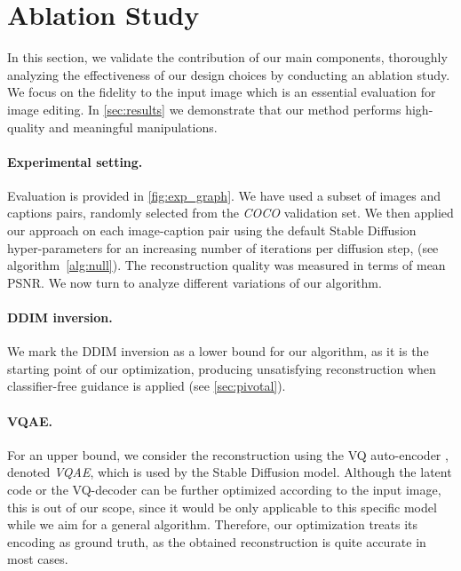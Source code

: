 









\section{Ablation Study}
\label{sec:ablation}
\vspace{-0.1cm}



In this section, we validate the contribution of our main components, thoroughly analyzing the effectiveness of our design choices by conducting an ablation study. We focus on the fidelity to the input image which is an essential evaluation for image editing. In \cref{sec:results} we demonstrate that our method performs high-quality and meaningful manipulations.




\vspace{-0.4cm}
\paragraph{Experimental setting.} Evaluation is provided in \cref{fig:exp_graph}. We have used a subset of  images and captions pairs, randomly selected from the \textit{COCO} \cite{chen2015microsoft} validation set.
We then applied our approach on each image-caption pair using the default Stable Diffusion hyper-parameters for an increasing number of iterations per diffusion step,  (see algorithm~\ref{alg:null}). The reconstruction quality was measured in terms of mean PSNR. We now turn to analyze different variations of our algorithm. 

\vspace{-0.4cm}
\paragraph{DDIM inversion.} We mark the DDIM inversion as a lower bound for our algorithm, as it is the starting point of our optimization, producing unsatisfying reconstruction when classifier-free guidance is applied (see \cref{sec:pivotal}).

\vspace{-0.4cm}
\paragraph{VQAE.} For an upper bound, we consider the reconstruction using the VQ auto-encoder \cite{esser2020taming}, denoted \textit{VQAE}, which is used by the Stable Diffusion model. Although the latent code or the VQ-decoder can be further optimized according to the input image, this is out of our scope, since it would be only applicable to this specific model \cite{rombach2021highresolution} while we aim for a general algorithm. Therefore, our optimization treats its encoding  as ground truth, as the obtained reconstruction is quite accurate in most cases.


